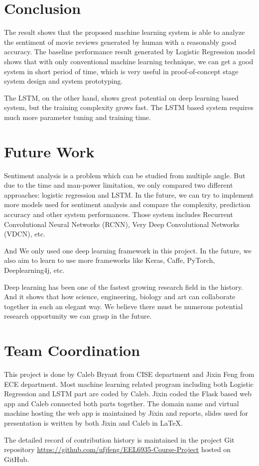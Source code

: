 \documentclass[conference]{IEEEtran}
\begin{document}
\section{Conclusion}
\label{conclusion}
    The result shows that the proposed machine learning system is able to 
    analyze the sentiment of movie reviews generated by human with a reasonably
    good accuracy. The baseline performance result generated by Logistic Regression
    model shows that with only conventional machine learning technique, we can 
    get a good system in short period of time, which is very useful in 
    proof-of-concept stage system design and system prototyping.
    
    The LSTM, on the other hand, shows great potential on deep learning based
    system, but the training complexity grows fast. The LSTM based system requires
    much more parameter tuning and training time. 
    
\section{Future Work}
\label{future}
    Sentiment analysis is a problem which can be studied from multiple angle. But due 
    to the time and man-power limitation, we only compared two different approaches:
    logistic regression and LSTM. In the future, we can try to implement more models used
    for sentiment analysis and compare the complexity, prediction accuracy and other
    system performances. Those system includes Recurrent Convolutional
    Neural Networks (RCNN)\cite{lai2015recurrent}, Very Deep Convolutional Networks 
    (VDCN)\cite{conneau2017very}, etc.
    
    And We only used one deep learning framework in this project. In the future, we
    also aim to learn to use more frameworks like Keras\cite{chollet2015keras},
    Caffe\cite{jia2014caffe}, PyTorch\cite{paszke2017automatic}, 
    Deeplearning4j\cite{nicholson2017deeplearning4j}, etc.
    
    Deep learning has been one of the fastest growing research field in the history.
    And it shows that how science, engineering, biology and art can collaborate together
    in such an elegant way. We believe there must be numerous potential research opportunity
    we can grasp in the future.


\section{Team Coordination}
\label{team}
    This project is done by Caleb Bryant from CISE department and Jixin Feng from ECE 
    department. Most machine learning related program including both Logistic 
    Regression and LSTM part are coded by Caleb. Jixin coded the Flask based web app
    and Caleb connected both parts together. The domain name and virtual machine hosting
    the web app is maintained by Jixin and reports, slides used for presentation
    is written by both Jixin and Caleb in \LaTeX.
    
    The detailed record of contribution history is maintained in the project Git repository
    \url{https://github.com/ufjfeng/EEL6935-Course-Project} hosted on GitHub.




\end{document}

